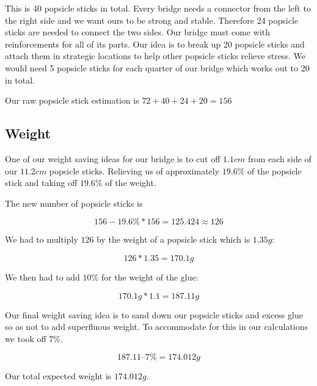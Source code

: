 \documentclass[paper=a4, fontsize=11pt]{scrartcl}
\numberwithin{equation}{section}		%
\numberwithin{figure}{section}			%
\numberwithin{table}{section}				%
\begin{document}
This is 40 popsicle sticks in total. Every bridge needs a connector from the left to the right side and we want ours to be strong and stable. Therefore 24 popsicle sticks are needed to connect the two sides. Our bridge must come with reinforcements for all of its parts. Our idea is to break up 20 popsicle sticks and attach them in strategic locations to help other popsicle sticks relieve stress. We would need 5 popsicle sticks for each quarter of our bridge which works out to 20 in total.

Our raw popsicle stick estimation is $72 + 40 + 24 + 20 = 156$

\subsection{Weight}
One of our weight saving ideas for our bridge is to cut off $1.1cm$ from each side of our $11.2cm$ popsicle sticks. Relieving us of approximately $19.6\%$ of the popsicle stick and taking off $19.6\%$ of the weight.

The new number of popsicle sticks is 

\[156 - 19.6\%*156 = 125.424\approx126\]

We had to multiply $126$ by the weight of a popsicle stick which is $1.35g$: 

\[126 * 1.35 = 170.1g\]

We then had to add $10\%$ for the weight of the glue: 

\[170.1g * 1.1 = 187.11g\]

Our final weight saving idea is to sand down our popsicle sticks and excess glue so as not to add superfluous weight. To accommodate for this in our calculations we took off $7\%$. 

\[187.11 – 7\% = 174.012g\]

Our total expected weight is $174.012g$.
\end{document}
